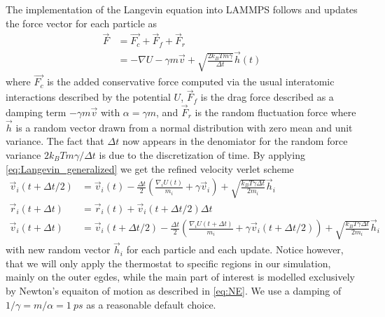 The implementation of the Langevin equation into LAMMPS follows
\cite{PhysRevB.17.1302} and updates the force vector for each particle as 
\begin{align}
  \vec{F} &= \vec{F_c} + \vec{F}_{f} + \vec{F}_{r} \nonumber \\
  &= -\nabla U - \gamma m \vec{v} + \sqrt{\frac{2 k_B T m \gamma}{\Delta t}}\vec{h}(t)
  \label{eq:Langevin_generalized}
\end{align}
where $\vec{F_c}$ is the added conservative force computed via the usual
interatomic interactions described by the potential $U$, $\vec{F}_f$ is the
drag force described as a damping term $-\gamma m \vec{v}$ with $\alpha = \gamma m$, and $\vec{F}_r$ is the random fluctuation force where $\vec{h}$ is a
random vector drawn from a normal distribution with zero mean and unit variance. The fact that $\Delta t$ now appears in the denomiator for the random force variance $2k_B T m \gamma / \Delta t$ is due to the discretization of time. By applying \cref{eq:Langevin_generalized} we get the refined velocity verlet scheme
\begin{align*}
  \vec{v}_i(t + \Delta t/2)  &= \vec{v}_i(t) - \frac{\Delta t}{2}\left(\frac{\nabla_i U(t)}{m_i} + \gamma \vec{v}_i \right) + \sqrt{\frac{k_B T \gamma \Delta t}{2m_i}} \vec{h}_i \\ 
  \vec{r}_i(t + \Delta t) &= \vec{r}_i(t) + \vec{v}_i(t + \Delta t/2) \Delta t \\
  \vec{v}_i(t + \Delta t) &= \vec{v}_i(t+ \Delta t/2) - \frac{\Delta t}{2}\left(\frac{\nabla_i U(t + \Delta t)}{m_i} + \gamma \vec{v}_i(t + \Delta t/2) \right) + \sqrt{\frac{k_B T \gamma \Delta t}{2m_i}} \vec{h}_i
\end{align*}
with new random vector $\vec{h}_i$ for each particle and each update. Notice
however, that we will only apply the thermostat to specific regions in our simulation, mainly on the outer egdes, while the main part of interest is modelled exclusively by Newton's equaiton of motion as described in \cref{eq:NE}. We use a damping of $1/\gamma = m/\alpha = \SI{1}{ps}$ as a reasonable default choice. 




